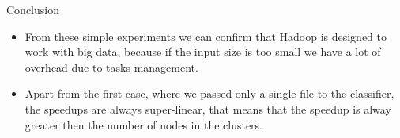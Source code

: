 \documentclass{beamer}
\begin{document}
\begin{frame}{Conclusion}

\begin{itemize}
\item
From these simple experiments we can confirm that Hadoop is designed to work with big data, because if the input size is too small we have a lot of overhead due to tasks management.
\item
Apart from the first case, where we passed only a single file to the classifier, the speedups are always super-linear, that means that the speedup is alway greater then the number of nodes in the clusters.
\end{itemize}

\end{frame}
\end{document}
